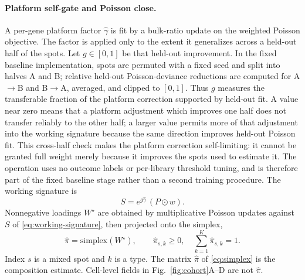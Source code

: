 \paragraph{Platform self-gate and Poisson close.}
A per-gene platform factor \(\hat\gamma\) is fit by a bulk-ratio update on the weighted Poisson objective. The factor is applied only to the extent it generalizes across a held-out half of the spots. Let \(g\in[0,1]\) be that held-out improvement. In the fixed baseline implementation, spots are permuted with a fixed seed and split into halves A and B; relative held-out Poisson-deviance reductions are computed for A\(\to\)B and B\(\to\)A, averaged, and clipped to \([0,1]\). Thus \(g\) measures the transferable fraction of the platform correction supported by held-out fit. A value near zero means that a platform adjustment which improves one half does not transfer reliably to the other half; a larger value permits more of that adjustment into the working signature because the same direction improves held-out Poisson fit. This cross-half check makes the platform correction self-limiting: it cannot be granted full weight merely because it improves the spots used to estimate it. The operation uses no outcome labels or per-library threshold tuning, and is therefore part of the fixed baseline stage rather than a second training procedure. The working signature is
\begin{equation}
S=e^{g\hat\gamma}\,(P\odot w).
\label{eq:working-signature}
\end{equation}
Nonnegative loadings \(W^\star\) are obtained by multiplicative Poisson updates against \(S\) of \eqref{eq:working-signature}, then projected onto the simplex,
\begin{equation}
\hat\pi=\mathrm{simplex}(W^\star),\qquad \hat\pi_{s,k}\ge 0,\quad \sum_{k=1}^{K}\hat\pi_{s,k}=1.
\label{eq:simplex}
\end{equation}
Index \(s\) is a mixed spot and \(k\) is a type. The matrix \(\hat\pi\) of \eqref{eq:simplex} is the composition estimate. Cell-level fields in Fig.~\ref{fig:cohort}A--D are not \(\hat\pi\).

